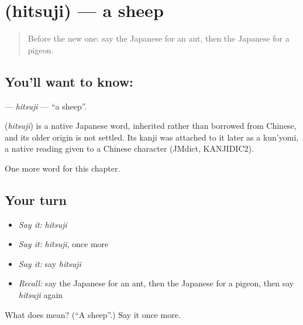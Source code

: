 \section[\texorpdfstring{\ja{ひつじ} (hitsuji)}{ひつじ (hitsuji)}]{ (hitsuji) — a sheep}

\label{lesson:JA-C46-hitsuji}



\begin{quote}
Before the new one: say the Japanese for an ant, then the Japanese for a pigeon.
\end{quote}

\subsection*{You'll want to know: }
\textbf{} — \emph{hitsuji} — \textquotedblleft{}a sheep\textquotedblright{}.

\begin{cousinweb}
\textbf{} (\emph{hitsuji}) is a native Japanese word, inherited rather than borrowed from Chinese, and its older origin is not settled. Its kanji was attached to it later as a kun'yomi, a native reading given to a Chinese character (JMdict, KANJIDIC2).
\end{cousinweb}

\begin{grammarlens}[title={What you've built}]
One more word for this chapter.
\end{grammarlens}

\subsection*{Your turn}
\begin{itemize}
\raggedright
  \item \emph{Say it:} \emph{hitsuji}
  \item \emph{Say it:} \emph{hitsuji}, once more
  \item \emph{Say it:} say \emph{hitsuji}
  \item \emph{Recall:} say the Japanese for an ant, then the Japanese for a pigeon, then say \emph{hitsuji} again
\end{itemize}

\begin{tcolorbox}[breakable,colback=teal!4,colframe=teal!35!black,title={Before you move on}]
What does  mean? (\textquotedblleft{}A sheep\textquotedblright{}.) Say it once more.
\end{tcolorbox}
